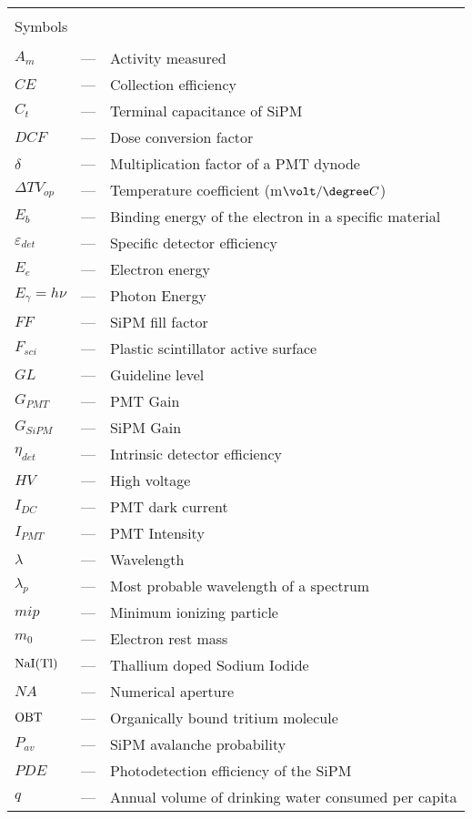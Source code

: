 \begin{longtable}{p{25mm} c p{120mm} }
\\
\\
\multicolumn{3}{l}{Symbols}\\
\\
$A_{m}$ & --- & Activity measured\\
$CE$ & --- & Collection efficiency\\
$C_t$ & --- & Terminal capacitance of SiPM\\
$DCF$ & --- & Dose conversion factor\\
$\delta$ & --- & Multiplication factor of a PMT dynode\\
$\Delta TV_{op}$ & --- & Temperature coefficient (m$\volt/\degree C$)\\
$E_b$ & --- & Binding energy of the electron in a specific material\\
$\varepsilon_{det}$ & --- & Specific detector efficiency\\
$E_e$ & --- & Electron energy\\
$E_\gamma = h\nu$ & --- & Photon Energy\\
$FF$ & --- & SiPM fill factor\\
$F_{sci}$ & --- & Plastic scintillator active surface\\
$GL$ & --- & Guideline level\\
$G_{PMT}$ & --- & PMT Gain\\
$G_{SiPM}$ & --- & SiPM Gain\\
$\eta_{det}$ & --- & Intrinsic detector efficiency\\
$HV$ & --- & High voltage\\
$I_{DC}$ & --- & PMT dark current\\
$I_{PMT}$ & --- & PMT Intensity\\
$\lambda$ & --- & Wavelength\\
$\lambda_p$ & --- & Most probable wavelength of a spectrum\\
$mip$ & --- & Minimum ionizing particle\\
$m_0$ & --- & Electron rest mass\\
$\ce{NaI(Tl)}$ & --- & Thallium doped Sodium Iodide\\
$NA$ & --- & Numerical aperture\\
$\ce{OBT}$ & --- & Organically bound tritium molecule\\
$P_{av}$ & --- & SiPM avalanche probability\\
$PDE$ & --- & Photodetection efficiency of the SiPM\\
$q$ & --- & Annual volume of drinking water consumed per capita\\

\end{longtable}
